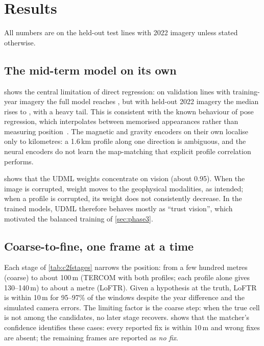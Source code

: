 \documentclass[11pt,a4paper]{article}
\begin{document}
\section{Results}\label{sec:results}
All numbers are on the held-out test lines with 2022 imagery unless stated otherwise.

\subsection{The mid-term model on its own}



 shows the central limitation of direct regression: on validation lines with
training-year imagery the full model reaches \ResvisionmaggravValMedian{}, but with held-out 2022
imagery the median rises to \ResvisionmaggravMedian{}, with a heavy tail. This is consistent with the
known behaviour of pose regression, which interpolates between memorised appearances rather than
measuring position~\cite{sattler2019limits}. The magnetic and gravity encoders on their own localise
only to kilometres: a 1.6\,km profile along one direction is ambiguous, and the neural encoders do not
learn the map-matching that explicit profile correlation performs.

 shows that the UDML weights concentrate on vision (about 0.95). When the image is
corrupted, weight moves to the geophysical modalities, as intended; when a profile is corrupted, its
weight does not consistently decrease. In the trained models, UDML therefore behaves mostly as
``trust vision'', which motivated the balanced training of \cref{sec:phase3}.

\subsection{Coarse-to-fine, one frame at a time}



Each stage of \cref{tab:c2fstages} narrows the position: from a few hundred metres (coarse) to about
100\,m (TERCOM with both profiles; each profile alone gives 130--140\,m) to about a metre (LoFTR).
Given a hypothesis at the truth, LoFTR is within 10\,m for 95--97\% of the windows despite the year
difference and the simulated camera errors. The limiting factor is the coarse step: when the true
cell is not among the candidates, no later stage recovers.  shows that the matcher's
confidence identifies these cases: every reported fix is within 10\,m and wrong fixes are absent; the
remaining frames are reported as \emph{no fix}.
\end{document}
